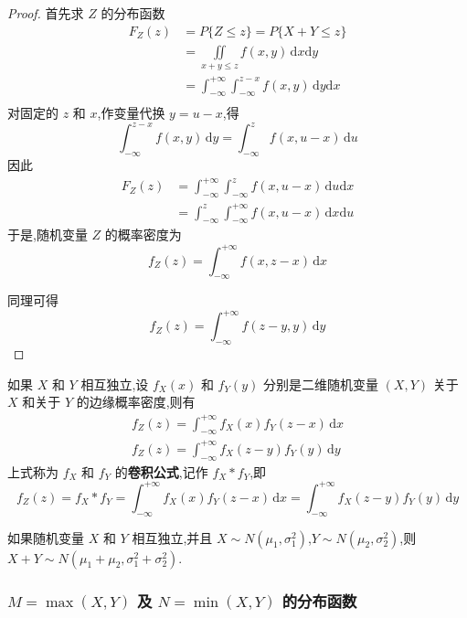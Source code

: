 \begin{proof}
    首先求 $Z$ 的分布函数
    $$
    \begin{aligned}
        F_{Z}(z) &= P\{Z \leqslant z\} = P\{X+Y \leqslant z\} \\
        &= \underset{x+y \leqslant z}{\iint} f(x,y) \, \text{d}x \text{d}y \\
        &= \int_{-\infty}^{+\infty} \int_{-\infty}^{z-x} f(x,y) \, \text{d}y \text{d}x \\
    \end{aligned}
    $$
    对固定的 $z$ 和 $x$,作变量代换 $y=u-x$,得
    $$
    \int_{-\infty}^{z-x} f(x,y) \, \text{d}y = \int_{-\infty}^z f(x,u-x) \, \text{d}u
    $$
    因此
    $$
    \begin{aligned}
        F_{Z}(z) &= \int_{-\infty}^{+\infty} \int_{-\infty}^z f(x,u-x) \, \text{d}u \text{d}x \\
        &= \int_{-\infty}^z \int_{-\infty}^{+\infty} f(x,u-x) \, \text{d}x \text{d}u 
    \end{aligned}
    $$
    于是,随机变量 $Z$ 的概率密度为
    $$
    f_{Z}(z) = \int_{-\infty}^{+\infty} f(x,z-x) \, \text{d}x
    $$

    同理可得
    $$
    f_{Z}(z) = \int_{-\infty}^{+\infty} f(z-y,y) \, \text{d}y
    $$
\end{proof}

如果 $X$ 和 $Y$ 相互独立,设 $f_{X}(x)$ 和 $f_{Y}(y)$ 分别是二维随机变量 $(X,Y)$ 关于 $X$ 和关于 $Y$ 的边缘概率密度,则有
\begin{gather*}
    f_{Z}(z) = \int_{-\infty}^{+\infty} f_{X}(x) f_{Y}(z-x) \, \text{d}x \\
    f_{Z}(z) = \int_{-\infty}^{+\infty} f_{X}(z-y) f_{Y}(y) \, \text{d}y
\end{gather*}
上式称为 $f_X$ 和 $f_Y$ 的\textbf{卷积公式},记作 $f_X * f_Y$,即
\begin{equation}
    f_{Z}(z) = f_X * f_Y = \int_{-\infty}^{+\infty} f_{X}(x) f_{Y}(z-x) \, \text{d}x = \int_{-\infty}^{+\infty} f_{X}(z-y) f_{Y}(y) \, \text{d}y
\end{equation}

\begin{conclusion}
    如果随机变量 $X$ 和 $Y$ 相互独立,并且 $X \sim N(\mu_1,\sigma_1^2)$,$Y \sim N(\mu_2,\sigma_2^2)$,则 $X+Y \sim N(\mu_1 + \mu_2, \sigma_1^2 + \sigma_2^2)$.
\end{conclusion}

\subsubsection{\texorpdfstring{$M = \max(X,Y)$}{} 及 \texorpdfstring{$N = \min(X,Y)$}{} 的分布函数}

